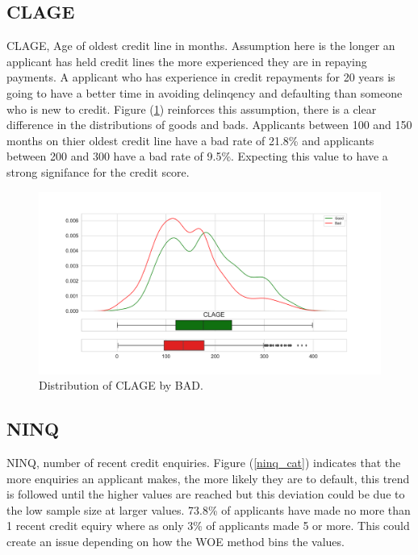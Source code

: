 \subsection*{CLAGE}

CLAGE, Age of oldest credit line in months. Assumption here is the longer an applicant has held credit lines the more experienced they are in repaying payments. A applicant who has experience in credit repayments for 20 years is going to have a better time in avoiding delinqency and defaulting than someone who is new to credit. Figure (\ref{clage_dist}) reinforces this assumption,  there is a clear difference in the distributions of goods and bads. Applicants between 100 and 150 months on thier oldest credit line have a bad rate of 21.8\% and applicants between 200 and 300 have a bad rate of 9.5\%. Expecting this value to have a strong signifance for the credit score.

\begin{figure}[H]
	\centering
	\includegraphics[scale=0.40]{figs/clage_dist.pdf}
	\caption{Distribution of CLAGE by BAD. \label{clage_dist}}
\end{figure}

\subsection*{NINQ}

NINQ,  number of recent credit enquiries. Figure (\ref{ninq_cat}) indicates that the more enquiries an applicant makes, the more likely they are to default, this trend is followed until the higher values are reached but this deviation could be due to the low sample size at larger values. 73.8\% of applicants have made no more than 1 recent credit equiry where as only 3\% of applicants made 5 or more. This could create an issue depending on how the WOE method bins the values.

